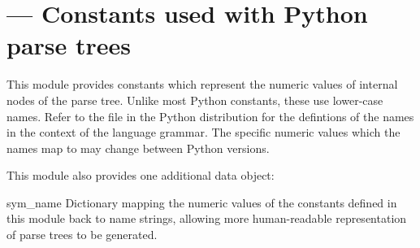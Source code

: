 \section{ ---
         Constants used with Python parse trees}



This module provides constants which represent the numeric values of
internal nodes of the parse tree.  Unlike most Python constants, these
use lower-case names.  Refer to the file  in the
Python distribution for the defintions of the names in the context of
the language grammar.  The specific numeric values which the names map
to may change between Python versions.

This module also provides one additional data object:



\begin{datadesc}{sym_name}
Dictionary mapping the numeric values of the constants defined in this
module back to name strings, allowing more human-readable
representation of parse trees to be generated.
\end{datadesc}

\begin{seealso}
\end{seealso}
